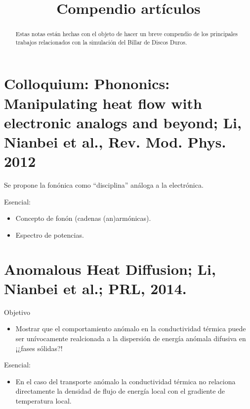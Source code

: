 \documentclass[11pt,letterpaper]{article}
\begin{document}
\title{Compendio artículos}
\maketitle

\begin{abstract}
Estas notas están hechas con el objeto de hacer un breve compendio de los principales trabajos relacionados con la simulación del Billar de Discos Duros.
\end{abstract}

\section*{Colloquium: Phononics: Manipulating heat flow with electronic
analogs and beyond; Li, Nianbei et al., Rev. Mod. Phys. 2012}

Se propone la fonónica como ``disciplina'' análoga a la electrónica. 

Esencial:
\begin{itemize}
\item  Concepto de fonón (cadenas (an)armónicas).
\item  Espectro de potencias. 
\end{itemize}

\section*{Anomalous Heat Diffusion; Li, Nianbei et al.; PRL, 2014.}

Objetivo
\begin{itemize}
\item Mostrar que el comportamiento anómalo en la conductividad térmica puede ser unívocamente realcionada a la dispersión de energía anómala difusiva en ¡¿fases sólidas?!
\end{itemize}

Esencial:
\begin{itemize}
\item En el caso del transporte anómalo la conductividad térmica no relaciona directamente la densidad de flujo de energía local con el gradiente de temperatura local.
\end{itemize}
\end{document}
